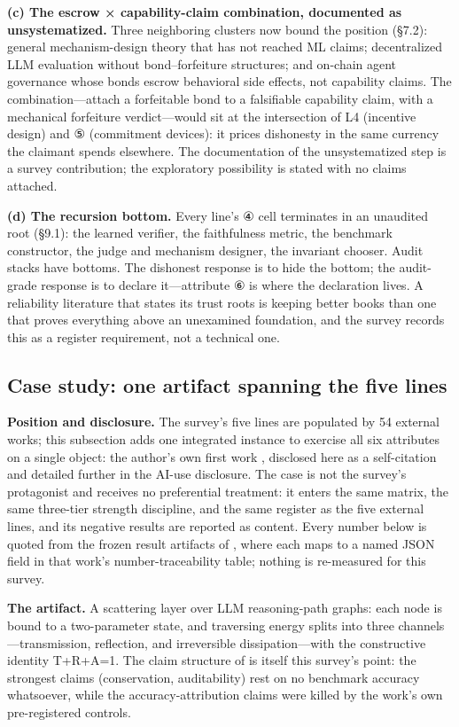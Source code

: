 \documentclass[11pt,a4paper]{article}
\begin{document}
\textbf{(c) The escrow × capability-claim combination, documented as unsystematized.} Three neighboring clusters now bound the position (§7.2): general mechanism-design theory \cite{key38} that has not reached ML claims; decentralized LLM evaluation \cite{key39,key40,key41} without bond–forfeiture structures; and on-chain agent governance \cite{key42,key43,key44,key45} whose bonds escrow behavioral side effects, not capability claims. The combination—attach a forfeitable bond to a falsifiable capability claim, with a mechanical forfeiture verdict—would sit at the intersection of L4 (incentive design) and ⑤ (commitment devices): it prices dishonesty in the same currency the claimant spends elsewhere. The documentation of the unsystematized step is a survey contribution; the exploratory possibility is stated with no claims attached.

\textbf{(d) The recursion bottom.} Every line's ④ cell terminates in an unaudited root (§9.1): the learned verifier, the faithfulness metric, the benchmark constructor, the judge and mechanism designer, the invariant chooser. Audit stacks have bottoms. The dishonest response is to hide the bottom; the audit-grade response is to declare it—attribute ⑥ is where the declaration lives. A reliability literature that states its trust roots is keeping better books than one that proves everything above an unexamined foundation, and the survey records this as a register requirement, not a technical one.

\subsection{Case study: one artifact spanning the five lines}

\textbf{Position and disclosure.} The survey's five lines are populated by 54 external works; this subsection adds one integrated instance to exercise all six attributes on a single object: the author's own first work \cite{key04}, disclosed here as a self-citation and detailed further in the AI-use disclosure. The case is not the survey's protagonist and receives no preferential treatment: it enters the same matrix, the same three-tier strength discipline, and the same register as the five external lines, and its negative results are reported as content. Every number below is quoted from the frozen result artifacts of \cite{key04}, where each maps to a named JSON field in that work's number-traceability table; nothing is re-measured for this survey.

\textbf{The artifact.} A scattering layer over LLM reasoning-path graphs: each node is bound to a two-parameter state, and traversing energy splits into three channels—transmission, reflection, and irreversible dissipation—with the constructive identity T+R+A=1. The claim structure of \cite{key04} is itself this survey's point: the strongest claims (conservation, auditability) rest on no benchmark accuracy whatsoever, while the accuracy-attribution claims were killed by the work's own pre-registered controls.
\end{document}
